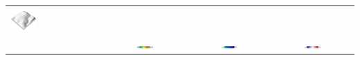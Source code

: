 \documentclass[prodmode,acmtochi]{acmsmall} %
\newcommand{\ra}[1]{\renewcommand{\arraystretch}{#1}}
\begin{document}
\begin{table}
{\begin{tabular}{m{} m{} m{} m{}}
\includegraphics[width=0.3\textwidth]{images/render_3d/mean_depth_difference_5.png}\\
%
& 
\multicolumn{1}{c}{\includegraphics[width=0.22\textwidth]{images/legends/elevation_legend_5.pdf}} &
\multicolumn{1}{c}{\includegraphics[width=0.22\textwidth]{images/legends/depth_legend.pdf}} &
\multicolumn{1}{c}{\includegraphics[width=0.22\textwidth]{images/legends/depth_diff_legend.pdf}}\\
%
\bottomrule
\end{tabular}}
\label{table:water_flow_experiment} 
\end{table}




\end{document}
